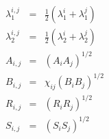 \documentclass[12pt]{article}
\begin{document}
\begin{eqnarray*}
\lambda_1^{i,j} &=& \frac{1}{2}(\lambda_1^i + \lambda_1^j)\\
\lambda_2^{i,j} &=& \frac{1}{2}(\lambda_2^i + \lambda_2^j)\\
A_{i,j} &=& (A_{i}A_{j})^{1/2}\\
B_{i,j} &=& \chi_{ij}(B_{i}B_{j})^{1/2}\\
R_{i,j} &=& (R_{i}R_{j})^{1/2}\\
S_{i,j} &=& (S_{i}S_{j})^{1/2}\\
\end{eqnarray*}                           
\end{document}
